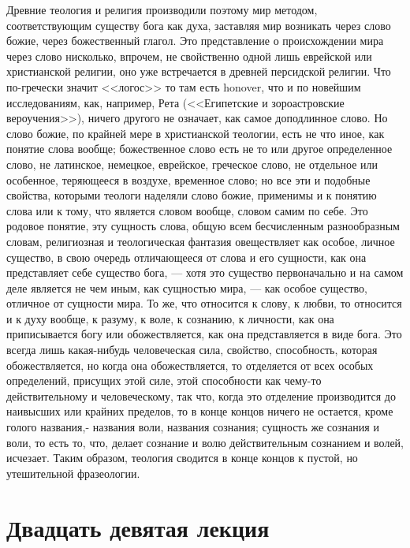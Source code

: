 \documentclass[12pt]{article}
\begin{document}
Древние теология и религия производили поэтому мир методом, соответствующим существу бога как духа, заставляя мир возникать через слово божие, через божественный глагол. Это представление о происхождении мира через слово нисколько, впрочем, не свойственно одной лишь еврейской или христианской религии, оно уже встречается в древней персидской религии. Что по-гречески значит <<логос>>  то там есть honover, что и по новейшим исследованиям, как, например, Рета (<<Египетские и зороастровские вероучения>>), ничего другого не означает, как самое доподлинное слово. Но слово божие, по крайней мере в христианской теологии, есть не что иное, как понятие слова вообще; божественное слово есть не то или другое определенное слово, не латинское, немецкое, еврейское, греческое слово, не отдельное или особенное, теряющееся в воздухе, временное слово; но все эти и подобные свойства, которыми теологи наделяли слово божие, применимы и к понятию слова или к тому, что является словом вообще, словом самим по себе. Это родовое понятие, эту сущность слова, общую всем бесчисленным разнообразным словам, религиозная и теологическая фантазия овеществляет как особое, личное существо, в свою очередь отличающееся от слова и его сущности, как она представляет себе существо бога, --- хотя это существо первоначально и на самом деле является не чем иным, как сущностью мира, --- как особое существо, отличное от сущности мира. То же, что относится к слову, к любви, то относится и к духу вообще, к разуму, к воле, к сознанию, к личности, как она приписывается богу или обожествляется, как она представляется в виде бога. Это всегда лишь какая-нибудь человеческая сила, свойство, способность, которая обожествляется, но когда она обожествляется, то отделяется от всех особых определений, присущих этой силе, этой способности как чему-то действительному и человеческому, так что, когда это отделение производится до наивысших или крайних пределов, то в конце концов ничего не остается, кроме голого названия,- названия воли, названия сознания; сущность же сознания и воли, то есть то, что, делает сознание и волю действительным сознанием и волей, исчезает. Таким образом, теология сводится в конце концов к пустой, но утешительной фразеологии. 

\section*{Двадцать девятая лекция}
\end{document}
